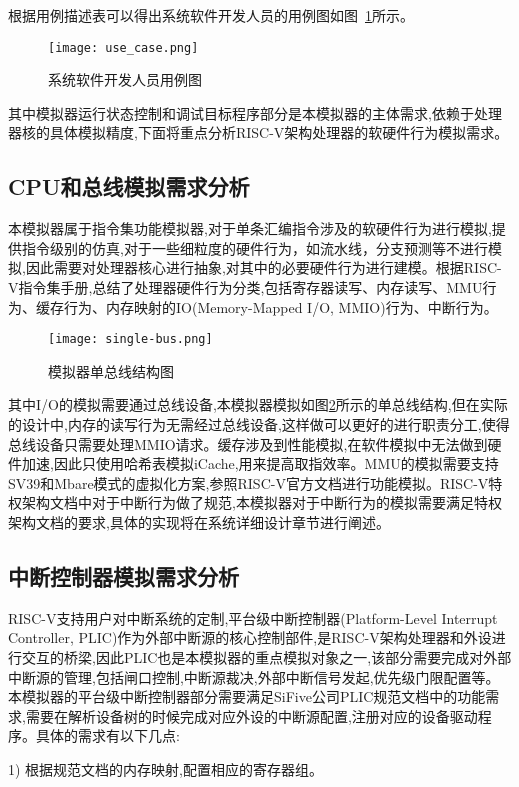 根据用例描述表可以得出系统软件开发人员的用例图如图~\ref{fig:use-case}所示。
\begin{figure}[H]
  \centering
  \texttt{[image: use\_case.png]}
  \caption{系统软件开发人员用例图}
  \label{fig:use-case}
\end{figure}


其中模拟器运行状态控制和调试目标程序部分是本模拟器的主体需求,依赖于处理器核的具体模拟精度,下面将重点分析RISC-V架构处理器的软硬件行为模拟需求。

\subsection{CPU和总线模拟需求分析}
本模拟器属于指令集功能模拟器,对于单条汇编指令涉及的软硬件行为进行模拟,提供指令级别的仿真,对于一些细粒度的硬件行为，如流水线，分支预测等不进行模拟,因此需要对处理器核心进行抽象,对其中的必要硬件行为进行建模。根据RISC-V指令集手册,总结了处理器硬件行为分类,包括寄存器读写、内存读写、MMU行为、缓存行为、内存映射的IO(Memory-Mapped I/O, MMIO)行为、中断行为。
\begin{figure}[H]
  \centering
  \texttt{[image: single-bus.png]}
  \caption{模拟器单总线结构图}
  \label{fig:single-bus}
\end{figure}

其中I/O的模拟需要通过总线设备,本模拟器模拟如图\ref{fig:single-bus}所示的单总线结构,但在实际的设计中,内存的读写行为无需经过总线设备,这样做可以更好的进行职责分工,使得总线设备只需要处理MMIO请求。缓存涉及到性能模拟,在软件模拟中无法做到硬件加速,因此只使用哈希表模拟iCache,用来提高取指效率。MMU的模拟需要支持SV39和Mbare模式的虚拟化方案,参照RISC-V官方文档进行功能模拟。RISC-V特权架构文档中对于中断行为做了规范,本模拟器对于中断行为的模拟需要满足特权架构文档的要求,具体的实现将在系统详细设计章节进行阐述。

\subsection{中断控制器模拟需求分析}
RISC-V支持用户对中断系统的定制,平台级中断控制器(Platform-Level Interrupt Controller, PLIC)作为外部中断源的核心控制部件,是RISC-V架构处理器和外设进行交互的桥梁,因此PLIC也是本模拟器的重点模拟对象之一,该部分需要完成对外部中断源的管理,包括闸口控制,中断源裁决,外部中断信号发起,优先级门限配置等。本模拟器的平台级中断控制器部分需要满足SiFive公司PLIC规范文档中的功能需求,需要在解析设备树的时候完成对应外设的中断源配置,注册对应的设备驱动程序。具体的需求有以下几点:


1) 根据规范文档的内存映射,配置相应的寄存器组。


